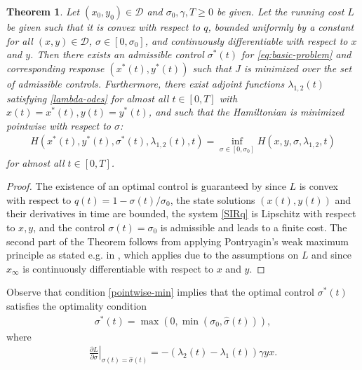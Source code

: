 \documentclass[english,12pt,letter]{article}
\newtheorem{thm}{Theorem}
\newcommand{\Rnot}{\sigma_0}
\newcommand{\Sinf}{x_\infty}
\newcommand{\dom}{{\mathcal D}}
\begin{document}
\begin{thm}
    Let $(x_0, y_0)\in\dom$ and $\Rnot, \gamma, T\ge 0$ be given.  
    Let the running cost $L$ be given such that it is convex with respect to $q$,
    bounded uniformly by a constant for all $(x,y)\in \dom$, $\sigma\in[0,\sigma_0]$,
    and continuously differentiable with respect to $x$ and $y$.
    Then there
    exists an admissible control $\sigma^*(t)$ for \eqref{eq:basic-problem} and corresponding
    response $(x^*(t),y^*(t))$ such that $J$ is minimized over the set of
    admissible controls.  Furthermore, there exist adjoint functions
    $\lambda_{1,2}(t)$ satisfying \eqref{lambda-odes} for almost all
    $t\in[0,T]$ with $x(t)=x^*(t), y(t)=y^*(t)$, and
    such that the Hamiltonian is minimized pointwise with respect to $\sigma$:
    \begin{align} \label{pointwise-min}
        H(x^*(t),y^*(t),\sigma^*(t),\lambda_{1,2}(t),t) = \inf_{\sigma\in[0,\sigma_0]} H(x,y,\sigma,\lambda_{1,2},t)
    \end{align}
    for almost all $t \in[0,T]$.
\end{thm}
\begin{proof}
    The existence of an optimal control is guaranteed by \cite[Theorem 23.11]{clarke2013functional}
    since $L$ is convex with respect to $q(t)=1-\sigma(t)/\Rnot$, the state solutions $(x(t),y(t))$
    and their derivatives in time
    are bounded, the system \eqref{SIRq} is Lipschitz with respect to $x, y$, and the control $\sigma(t)=\sigma_0$
    is admissible and leads to a finite cost.
    The second part of the Theorem follows from applying Pontryagin's weak
    maximum principle as stated e.g. in \cite[Theorem 22.2]{clarke2013functional},
    which applies due to the assumptions on $L$ and since $\Sinf$ is continuously differentiable with respect to $x$ and $y$.
\end{proof}
    Observe that condition \eqref{pointwise-min} implies that
    the optimal control $\sigma^*(t)$ satisfies the optimality condition
    \begin{align} \label{eq:sigma-c2}
        \sigma^*(t) = \max\left(0,\min\left(\sigma_0,\hat{\sigma}(t)\right)\right),
    \end{align}
    where
    \begin{align} \label{eq:dldsig}
        \left. \frac{\partial L}{\partial \sigma}\right|_{\sigma(t)=\hat{\sigma}(t)} = - (\lambda_2(t)-\lambda_1(t))\gamma y x.
    \end{align}
\end{document}
